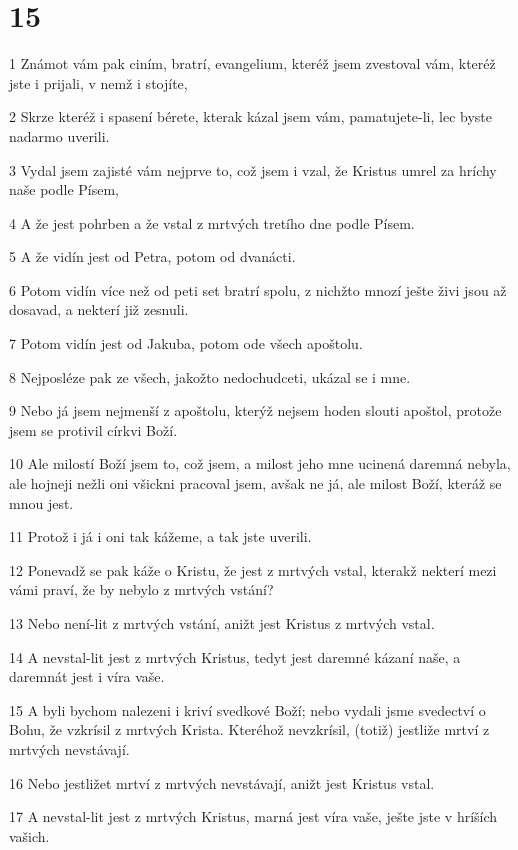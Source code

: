 \chapter{15}

\par 1 Známot vám pak ciním, bratrí, evangelium, kteréž jsem zvestoval vám, kteréž jste i prijali, v nemž i stojíte,
\par 2 Skrze kteréž i spasení bérete, kterak kázal jsem vám, pamatujete-li, lec byste nadarmo uverili.
\par 3 Vydal jsem zajisté vám nejprve to, což jsem i vzal, že Kristus umrel za hríchy naše podle Písem,
\par 4 A že jest pohrben a že vstal z mrtvých tretího dne podle Písem.
\par 5 A že vidín jest od Petra, potom od dvanácti.
\par 6 Potom vidín více než od peti set bratrí spolu, z nichžto mnozí ješte živi jsou až dosavad, a nekterí již zesnuli.
\par 7 Potom vidín jest od Jakuba, potom ode všech apoštolu.
\par 8 Nejposléze pak ze všech, jakožto nedochudceti, ukázal se i mne.
\par 9 Nebo já jsem nejmenší z apoštolu, kterýž nejsem hoden slouti apoštol, protože jsem se protivil církvi Boží.
\par 10 Ale milostí Boží jsem to, což jsem, a milost jeho mne ucinená daremná nebyla, ale hojneji nežli oni všickni pracoval jsem, avšak ne já, ale milost Boží, kteráž se mnou jest.
\par 11 Protož i já i oni tak kážeme, a tak jste uverili.
\par 12 Ponevadž se pak káže o Kristu, že jest z mrtvých vstal, kterakž nekterí mezi vámi praví, že by nebylo z mrtvých vstání?
\par 13 Nebo není-lit z mrtvých vstání, anižt jest Kristus z mrtvých vstal.
\par 14 A nevstal-lit jest z mrtvých Kristus, tedyt jest daremné kázaní naše, a daremnát jest i víra vaše.
\par 15 A byli bychom nalezeni i kriví svedkové Boží; nebo vydali jsme svedectví o Bohu, že vzkrísil z mrtvých Krista. Kteréhož nevzkrísil, (totiž) jestliže mrtví z mrtvých nevstávají.
\par 16 Nebo jestližet mrtví z mrtvých nevstávají, anižt jest Kristus vstal.
\par 17 A nevstal-lit jest z mrtvých Kristus, marná jest víra vaše, ješte jste v hríších vašich.
